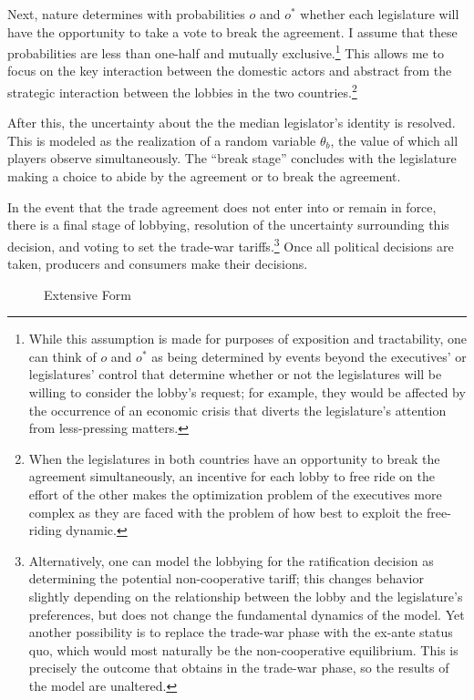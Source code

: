 \documentclass[10pt]{article}
\newcommand{\ta}{\theta}
\begin{document}
Next, nature determines with probabilities $o$ and $o^*$ whether each legislature will have the opportunity to take a vote to break the agreement. I assume that these probabilities are less than one-half and mutually exclusive.\footnote{While this assumption is made for purposes of exposition and tractability, one can think of $o$ and $o^*$ as being determined by events beyond the executives' or legislatures' control that determine whether or not the legislatures will be willing to consider the lobby's request; for example, they would be affected by the occurrence of an economic crisis that diverts the legislature's attention from less-pressing matters.} This allows me to focus on the key interaction between the domestic actors and abstract from the strategic interaction between the lobbies in the two countries.\footnote{When the legislatures in both countries have an opportunity to break the agreement simultaneously, an incentive for each lobby to free ride on the effort of the other makes the optimization problem of the executives more complex as they are faced with the problem of how best to exploit the free-riding dynamic.}

After this, the uncertainty about the the median legislator's identity is resolved. This is modeled as the realization of a random variable $\ta_b$, the value of which all players observe simultaneously. The ``break stage'' concludes with the legislature making a choice to abide by the agreement or to break the agreement.

In the event that the trade agreement does not enter into or remain in force, there is a final stage of lobbying, resolution of the uncertainty surrounding this decision, and voting to set the trade-war tariffs.\footnote{Alternatively, one can model the lobbying for the ratification decision as determining the potential non-cooperative tariff; this changes behavior slightly depending on the relationship between the lobby and the legislature's preferences, but does not change the fundamental dynamics of the model. Yet another possibility is to replace the trade-war phase with the ex-ante status quo, which would most naturally be the non-cooperative equilibrium. This is precisely the outcome that obtains in the trade-war phase, so the results of the model are unaltered.} Once all political decisions are taken, producers and consumers make their decisions.

\begin{figure}
	\begin{center}
		
	\end{center}
	\caption{Extensive Form\label{fig:ext}}
\end{figure}
\end{document}
